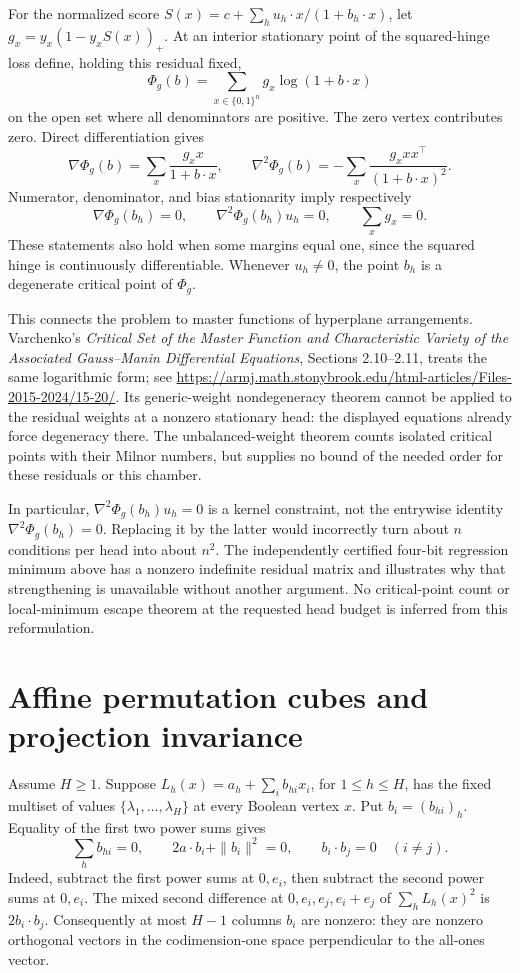 \documentclass[11pt]{article}
\begin{document}
For the normalized score $S(x)=c+\sum_h u_h\cdot x/(1+b_h\cdot x)$,
let $g_x=y_x(1-y_xS(x))_+$. At an interior stationary point of the
squared-hinge loss define, holding this residual fixed,
\[
 \Phi_g(b)=\sum_{x\in\{0,1\}^n}g_x\log(1+b\cdot x)
\]
on the open set where all denominators are positive. The zero vertex
contributes zero. Direct differentiation gives
\[
 \nabla\Phi_g(b)=\sum_x\frac{g_xx}{1+b\cdot x},\qquad
 \nabla^2\Phi_g(b)=-\sum_x\frac{g_xxx^{\top}}{(1+b\cdot x)^2}.
\]
Numerator, denominator, and bias stationarity imply respectively
\[
 \nabla\Phi_g(b_h)=0,\qquad
 \nabla^2\Phi_g(b_h)u_h=0,\qquad \sum_xg_x=0.
\]
These statements also hold when some margins equal one, since the
squared hinge is continuously differentiable. Whenever $u_h\ne0$,
the point $b_h$ is a degenerate critical point of $\Phi_g$.

This connects the problem to master functions of hyperplane
arrangements. Varchenko's \emph{Critical Set of the Master Function
and Characteristic Variety of the Associated Gauss--Manin Differential
Equations}, Sections 2.10--2.11, treats the same logarithmic form;
see \url{https://armj.math.stonybrook.edu/html-articles/Files-2015-2024/15-20/}.
Its generic-weight nondegeneracy theorem cannot be applied to the
residual weights at a nonzero stationary head: the displayed equations
already force degeneracy there. The unbalanced-weight theorem counts
isolated critical points with their Milnor numbers, but supplies no
bound of the needed order for these residuals or this chamber.

In particular, $\nabla^2\Phi_g(b_h)u_h=0$ is a kernel constraint,
not the entrywise identity $\nabla^2\Phi_g(b_h)=0$. Replacing it by
the latter would incorrectly turn about $n$ conditions per head into
about $n^2$. The independently certified four-bit regression minimum
above has a nonzero indefinite residual matrix and illustrates why
that strengthening is unavailable without another argument. No
critical-point count or local-minimum escape theorem at the requested
head budget is inferred from this reformulation.


\section{Affine permutation cubes and projection invariance}

Assume $H\ge1$. Suppose $L_h(x)=a_h+\sum_i b_{hi}x_i$, for $1\le h\le H$,
has the fixed multiset of values $\{\lambda_1,\ldots,\lambda_H\}$
at every Boolean vertex $x$. Put $b_i=(b_{hi})_h$. Equality of the
first two power sums gives
\[
 \sum_h b_{hi}=0,\qquad
 2a\cdot b_i+\|b_i\|^2=0,\qquad
 b_i\cdot b_j=0\quad(i\ne j).
\]
Indeed, subtract the first power sums at $0,e_i$, then subtract the
second power sums at $0,e_i$. The mixed second difference at
$0,e_i,e_j,e_i+e_j$ of $\sum_h L_h(x)^2$ is $2b_i\cdot b_j$.
Consequently at most $H-1$ columns $b_i$ are nonzero: they are
nonzero orthogonal vectors in the codimension-one space perpendicular
to the all-ones vector.
\end{document}
